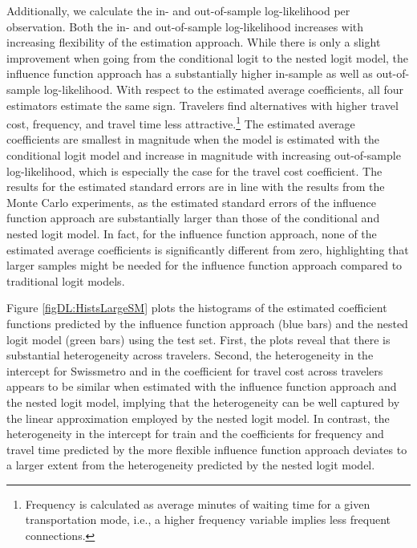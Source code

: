 \documentclass[a4paper, 12pt]{article}
\begin{document}
Additionally, we calculate the in- and out-of-sample log-likelihood per observation. Both the in- and out-of-sample log-likelihood increases with increasing flexibility of the estimation approach. While there is only a slight improvement when going from the conditional logit to the nested logit model, the influence function approach has a substantially higher in-sample as well as out-of-sample log-likelihood. 
With respect to the estimated average coefficients, all four estimators estimate the same sign. Travelers find alternatives with higher travel cost, frequency, and travel time less attractive.\footnote{Frequency is calculated as average minutes of waiting time  for a given transportation mode, i.e.,  a higher frequency variable implies less frequent connections.} 
The estimated average coefficients are smallest in magnitude when the model is estimated with the conditional logit model and increase in magnitude with increasing out-of-sample log-likelihood, which is especially the case for the travel cost coefficient.
The results for the estimated standard errors are in line with the results from the Monte Carlo experiments, as the estimated standard errors of the influence function approach are substantially larger than those of the conditional and nested logit model. In fact, for the influence function approach, none of the estimated average coefficients is significantly different from zero, highlighting that larger samples might be needed for the influence function approach compared to traditional logit models.


Figure \ref{figDL:HistsLargeSM} plots the histograms of the estimated coefficient functions predicted by the influence function approach (blue bars) and the nested logit model (green bars) using the test set. First, the plots reveal that there is substantial heterogeneity across travelers.  Second, the heterogeneity in the intercept for Swissmetro and in the coefficient for travel cost   across travelers appears to be similar when estimated with the influence function approach and the nested logit model, implying that the heterogeneity can be well captured by the linear approximation employed by the nested logit model. In contrast, the heterogeneity in the intercept for train and the coefficients for  frequency and travel time predicted by the more flexible  influence function approach deviates to a larger extent from the heterogeneity predicted by the nested logit model. %
\end{document}
